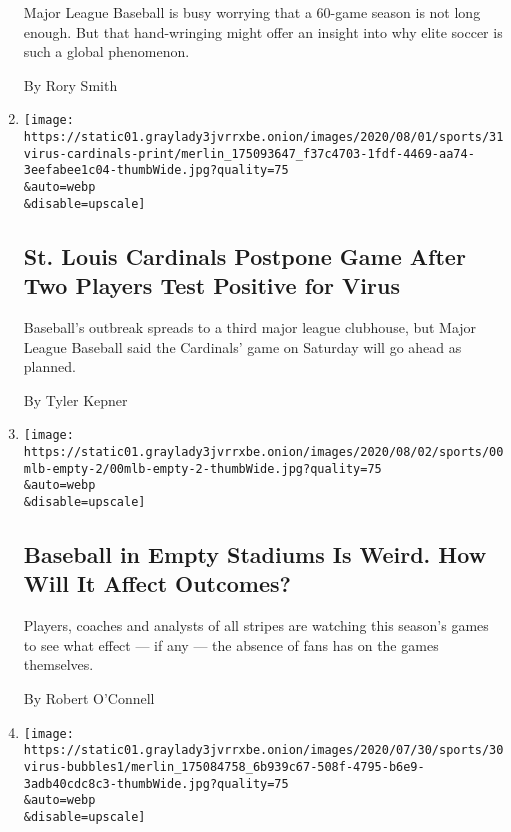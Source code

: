 \begin{enumerate}
  Major League Baseball is busy worrying that a 60-game season is not
  long enough. But that hand-wringing might offer an insight into why
  elite soccer is such a global phenomenon.

  By Rory Smith
\item
  \href{/2020/07/31/sports/baseball/cardinals-twins-coronavirus-mlb.html}{}

  \texttt{[image: https://static01.graylady3jvrrxbe.onion/images/2020/08/01/sports/31virus-cardinals-print/merlin\_175093647\_f37c4703-1fdf-4469-aa74-3eefabee1c04-thumbWide.jpg?quality=75\\\&auto=webp\\\&disable=upscale]}

  \hypertarget{st-louis-cardinals-postpone-game-after-two-players-test-positive-for-virus}{%
  \subsection{St. Louis Cardinals Postpone Game After Two Players Test
  Positive for
  Virus}\label{st-louis-cardinals-postpone-game-after-two-players-test-positive-for-virus}}

  Baseball's outbreak spreads to a third major league clubhouse, but
  Major League Baseball said the Cardinals' game on Saturday will go
  ahead as planned.

  By Tyler Kepner
\item
  \href{/2020/07/31/sports/baseball/baseball-empty-stadiums-effects.html}{}

  \texttt{[image: https://static01.graylady3jvrrxbe.onion/images/2020/08/02/sports/00mlb-empty-2/00mlb-empty-2-thumbWide.jpg?quality=75\\\&auto=webp\\\&disable=upscale]}

  \hypertarget{baseball-in-empty-stadiums-is-weird-how-will-it-affect-outcomes}{%
  \subsection{Baseball in Empty Stadiums Is Weird. How Will It Affect
  Outcomes?}\label{baseball-in-empty-stadiums-is-weird-how-will-it-affect-outcomes}}

  Players, coaches and analysts of all stripes are watching this
  season's games to see what effect --- if any --- the absence of fans
  has on the games themselves.

  By Robert O'Connell
\item
  \href{/2020/07/30/sports/basketball/sports-bubble-nba-mlb.html}{}

  \texttt{[image: https://static01.graylady3jvrrxbe.onion/images/2020/07/30/sports/30virus-bubbles1/merlin\_175084758\_6b939c67-508f-4795-b6e9-3adb40cdc8c3-thumbWide.jpg?quality=75\\\&auto=webp\\\&disable=upscale]}


\end{enumerate}
